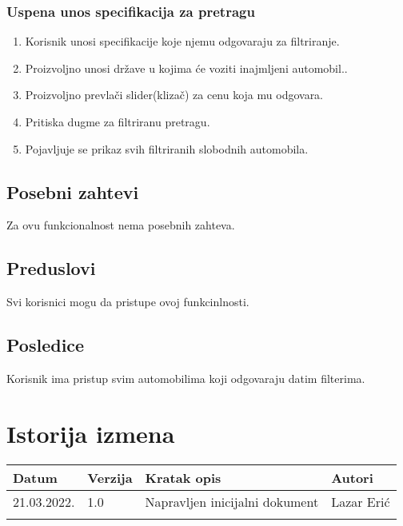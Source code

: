 \documentclass[12pt]{article}
\begin{document}
\subsubsection{Uspena unos specifikacija za pretragu}

\begin{enumerate}
    \item Korisnik unosi specifikacije koje njemu odgovaraju za filtriranje.
    \item Proizvoljno unosi države u kojima će voziti inajmljeni automobil..
    \item Proizvoljno prevlači slider(klizač) za cenu koja mu odgovara.
    \item Pritiska dugme za filtriranu pretragu.
    \item Pojavljuje se prikaz svih filtriranih slobodnih automobila.
\end{enumerate}

\subsection{Posebni zahtevi}
Za ovu funkcionalnost nema posebnih zahteva.
\subsection{Preduslovi}
Svi korisnici mogu da pristupe ovoj funkcinlnosti.
\subsection{Posledice}
Korisnik ima pristup svim automobilima koji odgovaraju datim filterima.

\section{Istorija izmena}
\begin{center}
\begin{tabular}{ | m{2cm} | m{1.5cm}| m{6cm} | m{5cm} | } 
\hline
Datum & Verzija & Kratak opis & Autori \\ 
\hline
 21.03.2022. & 1.0 & Napravljen inicijalni dokument & Lazar Erić\\ 
\hline
&&&\\ 
\hline
\end{tabular}
\end{center}
\end{document}
